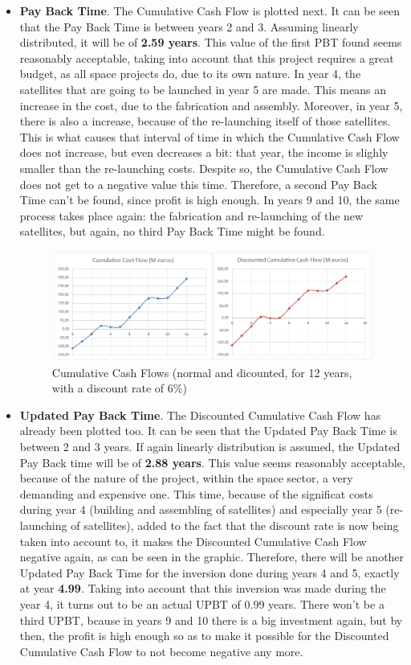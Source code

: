 \begin{itemize}
\item \textbf{Pay Back Time}. The Cumulative Cash Flow is plotted next. It can be seen that the Pay Back Time is between years 2 and 3. Assuming linearly distributed, it will be of \textbf{2.59 years}. This value of the first PBT found seems reasonably acceptable, taking into account that this project requires a great budget, as all space projects do, due to its own nature. In year 4, the satellites that are going to be launched in year 5 are made. This means an increase in the cost, due to the fabrication and assembly. Moreover, in year 5, there is also a increase, because of the re-launching itself of those satellites. This is what causes that interval of time in which the Cumulative Cash Flow does not increase, but even decreases a bit: that year, the income is slighly smaller than the re-launching costs. Despite so, the Cumulative Cash Flow does not get to a negative value this time. Therefore, a second Pay Back Time can't be found, since profit is high enough. In years 9 and 10, the same process takes place again: the fabrication and re-launching of the new satellites, but again, no third Pay Back Time might be found. 
\begin{figure}
\centering
\includegraphics[width=140mm]{CCFTogether.png}
\caption[Cumulative Cash Flows (normal and discounted)]{Cumulative Cash Flows (normal and dicounted, for 12 years, with a discount rate of 6\%)}
\end{figure}
\item \textbf{Updated Pay Back Time}. The Discounted Cumulative Cash Flow has already been plotted too. It can be seen that the Updated Pay Back Time is between 2 and 3 years. If again linearly distribution is assumed, the Updated Pay Back time will be of \textbf{2.88 years}. This value seems reasonably acceptable, because of the nature of the project, within the space sector, a very demanding and expensive one.
This time, because of the significat costs during year 4 (building and assembling of satellites) and especially year 5 (re-launching of satellites), added to the fact that the discount rate is now being taken into account to, it makes the Discounted Cumulative Cash Flow negative again, as can be seen in the graphic. Therefore, there will be another Updated Pay Back Time for the inversion done during years 4 and 5, exactly at year \textbf{4.99}. Taking into account that this inversion was made during the year 4, it turns out to be an actual UPBT of 0.99 years. There won't be a third UPBT, bcause in years 9 and 10 there is a big investment again, but by then, the profit is high enough so as to make it possible for the Discounted Cumulative Cash Flow to not become negative any more. 

\end{itemize}
